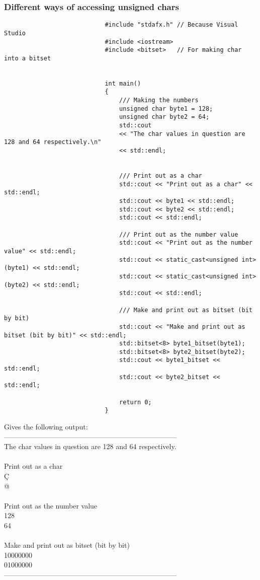 \documentclass{report}
\begin{document}
				\subsubsection{Different ways of accessing unsigned chars}
					\begin{minipage}{\linewidth}
						\begin{lstlisting}
							#include "stdafx.h"	// Because Visual Studio
							#include <iostream>
							#include <bitset>	// For making char into a bitset
							
							
							int main()
							{
								/// Making the numbers
								unsigned char byte1 = 128;
								unsigned char byte2 = 64;
								std::cout 
								<< "The char values in question are 128 and 64 respectively.\n"
								<< std::endl;
								
								
								/// Print out as a char
								std::cout << "Print out as a char" << std::endl;
								std::cout << byte1 << std::endl;
								std::cout << byte2 << std::endl;
								std::cout << std::endl;
								
								/// Print out as the number value
								std::cout << "Print out as the number value" << std::endl;
								std::cout << static_cast<unsigned int>(byte1) << std::endl;
								std::cout << static_cast<unsigned int>(byte2) << std::endl;
								std::cout << std::endl;
								
								/// Make and print out as bitset (bit by bit)
								std::cout << "Make and print out as bitset (bit by bit)" << std::endl;
								std::bitset<8> byte1_bitset(byte1);
								std::bitset<8> byte2_bitset(byte2);
								std::cout << byte1_bitset << std::endl;
								std::cout << byte2_bitset << std::endl;
								
								return 0;
							}
						\end{lstlisting}
					\end{minipage}
					
					\begin{minipage}{\linewidth}
						Gives the following output: \\
						-------------------------------------------------------------------------- \\
						The char values in question are 128 and 64 respectively. \\
						\\
						Print out as a char \\
						Ç \\
						@ \\
						\\
						Print out as the number value \\
						128 \\
						64 \\
						\\
						Make and print out as bitset (bit by bit) \\
						10000000 \\
						01000000 \\
						-------------------------------------------------------------------------- \\
					\end{minipage}
				
\end{document}
